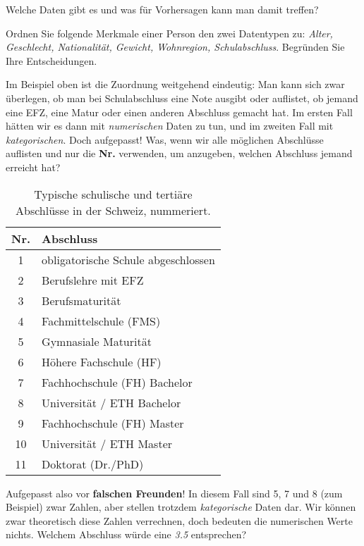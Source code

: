 \begin{lpu}{Welche Daten gibt es und was für Vorhersagen kann man damit treffen?}
\begin{aufgabe}{2}
Ordnen Sie folgende Merkmale einer Person den zwei Datentypen zu: \emph{Alter, Geschlecht, Nationalit\"at, Gewicht, Wohnregion, Schulabschluss}. Begr\"unden Sie Ihre Entscheidungen.
\end{aufgabe}

Im Beispiel oben ist die Zuordnung weitgehend eindeutig: Man kann sich zwar überlegen, ob man bei Schulabschluss eine Note ausgibt oder auflistet, ob jemand eine EFZ, eine Matur oder einen anderen Abschluss gemacht hat. Im ersten Fall hätten wir es dann mit \textit{numerischen} Daten zu tun, und im zweiten Fall mit \textit{kategorischen}. Doch aufgepasst! Was, wenn wir alle möglichen Abschlüsse auflisten und nur die \textbf{Nr.} verwenden, um anzugeben, welchen Abschluss jemand erreicht hat?

\begin{table}
\begin{center}
\begin{tabular}{|c|l|}
\hline
\textbf{Nr.} & \textbf{Abschluss} \\
\hline
1 & obligatorische Schule abgeschlossen \\
2 & Berufslehre mit EFZ \\
3 & Berufsmaturität \\
4 & Fachmittelschule (FMS) \\
5 & Gymnasiale Maturität \\
6 & Höhere Fachschule (HF) \\
7 & Fachhochschule (FH) Bachelor \\
8 & Universität / ETH Bachelor \\
9 & Fachhochschule (FH) Master \\
10 & Universität / ETH Master \\
11 & Doktorat (Dr./PhD) \\
\hline
\end{tabular}
\caption{Typische schulische und tertiäre Abschlüsse in der Schweiz, nummeriert.}
\label{tab:abschluesse}
\end{center}
\end{table}

\label{sec:categorical}
Aufgepasst also vor \textbf{falschen Freunden}! In diesem Fall sind 5, 7 und 8 (zum Beispiel) zwar Zahlen, aber stellen trotzdem \textit{kategorische} Daten dar. Wir können zwar theoretisch diese Zahlen verrechnen, doch bedeuten die numerischen Werte nichts. Welchem Abschluss würde eine \textit{3.5} entsprechen? 


\end{lpu}
